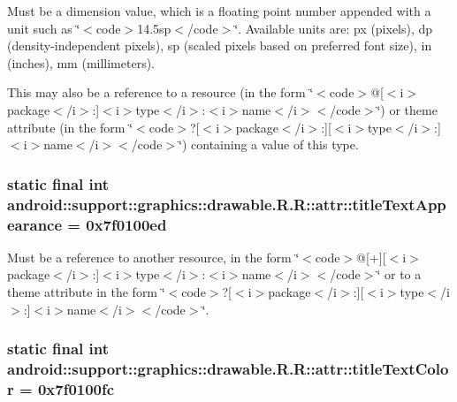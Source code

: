 Must be a dimension value, which is a floating point number appended with a unit such as \char`\"{}$<$code$>$14.5sp$<$/code$>$\char`\"{}. Available units are: px (pixels), dp (density-independent pixels), sp (scaled pixels based on preferred font size), in (inches), mm (millimeters). 

This may also be a reference to a resource (in the form \char`\"{}$<$code$>$@\mbox{[}$<$i$>$package$<$/i$>$:\mbox{]}$<$i$>$type$<$/i$>$:$<$i$>$name$<$/i$>$$<$/code$>$\char`\"{}) or theme attribute (in the form \char`\"{}$<$code$>$?\mbox{[}$<$i$>$package$<$/i$>$:\mbox{]}\mbox{[}$<$i$>$type$<$/i$>$:\mbox{]}$<$i$>$name$<$/i$>$$<$/code$>$\char`\"{}) containing a value of this type. \hypertarget{classandroid_1_1support_1_1graphics_1_1drawable_1_1_r_1_1attr_fac47330583f8a0d9e4d787094e77fdb}{
\subsubsection[{titleTextAppearance}]{\setlength{\rightskip}{0pt plus 5cm}static final int android::support::graphics::drawable.R.R::attr::titleTextAppearance = 0x7f0100ed}}
\label{classandroid_1_1support_1_1graphics_1_1drawable_1_1_r_1_1attr_fac47330583f8a0d9e4d787094e77fdb}


Must be a reference to another resource, in the form \char`\"{}$<$code$>$@\mbox{[}+\mbox{]}\mbox{[}$<$i$>$package$<$/i$>$:\mbox{]}$<$i$>$type$<$/i$>$:$<$i$>$name$<$/i$>$$<$/code$>$\char`\"{} or to a theme attribute in the form \char`\"{}$<$code$>$?\mbox{[}$<$i$>$package$<$/i$>$:\mbox{]}\mbox{[}$<$i$>$type$<$/i$>$:\mbox{]}$<$i$>$name$<$/i$>$$<$/code$>$\char`\"{}. \hypertarget{classandroid_1_1support_1_1graphics_1_1drawable_1_1_r_1_1attr_90d90341668f21bde482c39e687fa5a2}{
\subsubsection[{titleTextColor}]{\setlength{\rightskip}{0pt plus 5cm}static final int android::support::graphics::drawable.R.R::attr::titleTextColor = 0x7f0100fc}}
\label{classandroid_1_1support_1_1graphics_1_1drawable_1_1_r_1_1attr_90d90341668f21bde482c39e687fa5a2}


